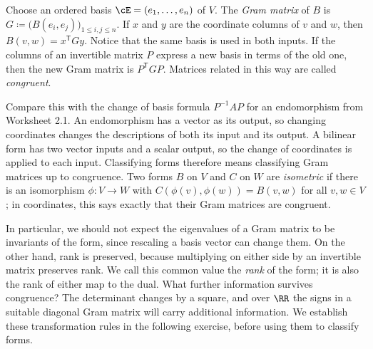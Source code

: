 \documentclass[12pt,reqno]{amsart}
\begin{document}
\hrulefill

Choose an ordered basis $\cE=(e_1,\ldots,e_n)$ of $V$. The \emph{Gram matrix} of $B$ is $G\coloneqq\big(B(e_i,e_j)\big)_{1\leq i,j\leq n}$. If $x$ and $y$ are the coordinate columns of $v$ and $w$, then $B(v,w)=x^{\mathsf T}Gy$. Notice that the same basis is used in both inputs. If the columns of an invertible matrix $P$ express a new basis in terms of the old one, then the new Gram matrix is $P^{\mathsf T}GP$. Matrices related in this way are called \emph{congruent}.

Compare this with the change of basis formula $P^{-1}AP$ for an endomorphism from Worksheet 2.1. An endomorphism has a vector as its output, so changing coordinates changes the descriptions of both its input and its output. A bilinear form has two vector inputs and a scalar output, so the change of coordinates is applied to each input. Classifying forms therefore means classifying Gram matrices up to congruence. Two forms $B$ on $V$ and $C$ on $W$ are \emph{isometric} if there is an isomorphism $\phi:V\to W$ with $C(\phi(v),\phi(w))=B(v,w)$ for all $v,w\in V$; in coordinates, this says exactly that their Gram matrices are congruent.

In particular, we should not expect the eigenvalues of a Gram matrix to be invariants of the form, since rescaling a basis vector can change them. On the other hand, rank is preserved, because multiplying on either side by an invertible matrix preserves rank. We call this common value the \emph{rank} of the form; it is also the rank of either map to the dual. What further information survives congruence? The determinant changes by a square, and over $\RR$ the signs in a suitable diagonal Gram matrix will carry additional information. We establish these transformation rules in the following exercise, before using them to classify forms.

\hrulefill
\end{document}
